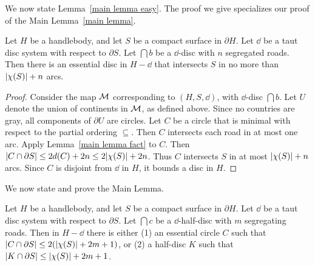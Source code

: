 We now state Lemma~\ref{main lemma easy}.
The proof we give specializes our proof of the Main Lemma~\ref{main lemma}.

\begin{lemma}
\label{main lemma easy}
Let $H$ be a handlebody, and let $S$ be a compact surface in 
$\partial H$.  Let $\dd$ be a taut disc system with respect 
to $\partial S$.  Let $\dint{b}$ be a $\dd$-disc with 
$n$ segregated roads.
Then there is an essential disc in $H-\dd$ that intersects $S$ in no more
than $| \chi (S) |+n$ arcs.
\end{lemma}

\begin{proof}
Consider the map $\mathcal{M}$ corresponding to $(H,S,\dd)$, with 
$\dd$-disc $\dint{b}$.
Let $U$ denote the union of continents in $\mathcal{M}$, as defined 
above.  Since no countries are gray, all components of 
$\partial U$ are circles.  Let $C$ be a circle that is minimal 
with respect to the partial ordering $\subseteq$.  Then $C$ 
intersects each road in at most one arc.
Apply Lemma~\ref{main lemma fact} to $C$.  Then 
$|C\cap\partial S|\leq 2d(C)+2n\leq 2| \chi (S) |+2n$.  Thus
$C$ intersects $S$ in at most $| \chi (S) |+n$ arcs.  Since $C$
is disjoint from $\dd$ in $H$, it bounds a disc in $H$.
\end{proof}

We now state and prove the Main Lemma.

\begin{lemma}
\label{main lemma}
Let $H$ be a handlebody, and let $S$ be a compact surface in $\partial H$.  Let $\dd$ be a taut disc system with respect to $\partial S$.  Let $\dint{c}$ be a $\dd$-half-disc with $m$ segregating roads. Then in $H-\dd$ there is either (1) an essential circle $C$ such that $|C\cap\partial S|\leq2(| \chi (S) |+2m+1)$, or (2) a half-disc $K$ such that $|K\cap\partial S|\leq| \chi (S) |+2m+1$.
\end{lemma}

